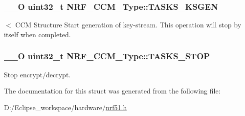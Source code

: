 \subsubsection[{T\+A\+S\+K\+S\+\_\+\+K\+S\+G\+E\+N}]{\setlength{\rightskip}{0pt plus 5cm}\+\_\+\+\_\+\+O uint32\+\_\+t N\+R\+F\+\_\+\+C\+C\+M\+\_\+\+Type\+::\+T\+A\+S\+K\+S\+\_\+\+K\+S\+G\+E\+N}\label{struct_n_r_f___c_c_m___type_a36ed958edc61a58b5897f264d46e52f0}
$<$ C\+C\+M Structure Start generation of key-\/stream. This operation will stop by itself when completed. \hypertarget{struct_n_r_f___c_c_m___type_ae71a4a1aee0280d39898d45e6758e22d}{}
\subsubsection[{T\+A\+S\+K\+S\+\_\+\+S\+T\+O\+P}]{\setlength{\rightskip}{0pt plus 5cm}\+\_\+\+\_\+\+O uint32\+\_\+t N\+R\+F\+\_\+\+C\+C\+M\+\_\+\+Type\+::\+T\+A\+S\+K\+S\+\_\+\+S\+T\+O\+P}\label{struct_n_r_f___c_c_m___type_ae71a4a1aee0280d39898d45e6758e22d}
Stop encrypt/decrypt. 

The documentation for this struct was generated from the following file\+:\begin{DoxyCompactItemize}
\item 
D\+:/\+Eclipse\+\_\+workspace/hardware/\hyperlink{nrf51_8h}{nrf51.\+h}\end{DoxyCompactItemize}
